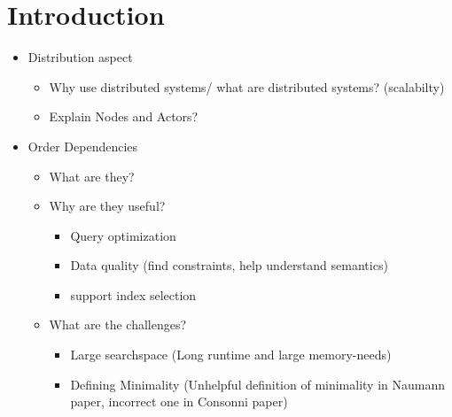 
\section{Introduction}\label{sec:intro}
	\begin{itemize}
		\item Distribution aspect
		\begin{itemize}
			\item Why use distributed systems/ what are distributed systems? (scalabilty)
			\item Explain Nodes and Actors?
		\end{itemize}		
		\item Order Dependencies
		\begin{itemize}
			\item What are they?
			\item Why are they useful?
			\begin{itemize}
				\item Query optimization
				\item Data quality (find constraints, help understand semantics)
				\item support index selection
			\end{itemize}
			\item What are the challenges? 
			\begin{itemize}
				\item Large searchspace (Long runtime and large memory-needs)
				\item Defining Minimality (Unhelpful definition of minimality in Naumann paper, incorrect one in Consonni paper)
			\end{itemize}
		\end{itemize}		 
	\end{itemize}


